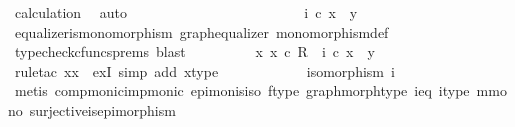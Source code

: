\begin{isabellebody}
\ calculation\ \isamarkupfalse%
\ auto\isanewline
\ \ \ \ \ \ \ \ \isamarkupfalse%
\isanewline
\ \ \ \ \ \ \isamarkupfalse%
\isanewline
\ \ \ \ \ \ \isamarkupfalse%
\ \isamarkupfalse%
\ {\isachardoublequoteopen}i\ {\isasymcirc}\isactrlsub c\ x{\isacharprime}{\kern0pt}\ {\isacharequal}{\kern0pt}\ y{\isacharprime}{\kern0pt}{\isachardoublequoteclose}\isanewline
\ \ \ \ \ \ \ \ \isamarkupfalse%
\ equalizer{\isacharunderscore}{\kern0pt}is{\isacharunderscore}{\kern0pt}monomorphism\ graph{\isacharunderscore}{\kern0pt}equalizer\ monomorphism{\isacharunderscore}{\kern0pt}def{}\ \isamarkupfalse%
\ {\isacharparenleft}{\kern0pt}typecheck{\isacharunderscore}{\kern0pt}cfuncs{\isacharunderscore}{\kern0pt}prems{\isacharcomma}{\kern0pt}\ blast{\isacharparenright}{\kern0pt}\isanewline
\ \ \ \ \ \ \isamarkupfalse%
\ \isamarkupfalse%
\ {\isachardoublequoteopen}{\isasymexists}x{\isacharprime}{\kern0pt}{\isachardot}{\kern0pt}\ x{\isacharprime}{\kern0pt}\ {\isasymin}\isactrlsub c\ R\ {\isasymand}\ i\ {\isasymcirc}\isactrlsub c\ x{\isacharprime}{\kern0pt}\ {\isacharequal}{\kern0pt}\ y{\isacharprime}{\kern0pt}{\isachardoublequoteclose}\isanewline
\ \ \ \ \ \ \ \ \isamarkupfalse%
\ {\isacharparenleft}{\kern0pt}rule{\isacharunderscore}{\kern0pt}tac\ x{\isacharequal}{\kern0pt}x{\isacharprime}{\kern0pt}\ \ exI{\isacharcomma}{\kern0pt}\ simp\ add{\isacharcolon}{\kern0pt}\ x{\isacharprime}{\kern0pt}{\isacharunderscore}{\kern0pt}type{\isacharparenright}{\kern0pt}\isanewline
\ \ \ \ \isamarkupfalse%
\isanewline
\ \ \ \ \isamarkupfalse%
\ \isamarkupfalse%
\ {\isachardoublequoteopen}isomorphism\ i{\isachardoublequoteclose}\isanewline
\ \ \ \ \ \ \isamarkupfalse%
\ {\isacharparenleft}{\kern0pt}metis\ comp{\isacharunderscore}{\kern0pt}monic{\isacharunderscore}{\kern0pt}imp{\isacharunderscore}{\kern0pt}monic{\isacharprime}{\kern0pt}\ epi{\isacharunderscore}{\kern0pt}mon{\isacharunderscore}{\kern0pt}is{\isacharunderscore}{\kern0pt}iso\ f{\isacharunderscore}{\kern0pt}type\ graph{\isacharunderscore}{\kern0pt}morph{\isacharunderscore}{\kern0pt}type\ i{\isacharunderscore}{\kern0pt}eq\ i{\isacharunderscore}{\kern0pt}type\ m{\isacharunderscore}{\kern0pt}mono\ surjective{\isacharunderscore}{\kern0pt}is{\isacharunderscore}{\kern0pt}epimorphism{\isacharparenright}{\kern0pt}\isanewline
\ \ \ \ \isamarkupfalse%
\ \isamarkupfalse%

\end{isabellebody}
